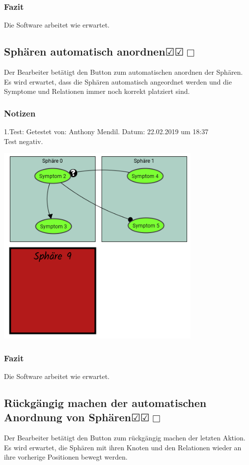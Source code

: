 \documentclass{scrartcl}
\newcommand{\subsectiont}[2]{\subsection[#1]{#1{\normalsize\normalfont #2}}}
\newcommand{\leer}{$\Box$}
\newcommand{\ok}{$\CheckedBox$}
\begin{document}
\subsubsection{Fazit}
Die Software arbeitet wie erwartet.

\subsectiont{Sphären automatisch anordnen}{\dotfill\ok\ok\leer}
Der Bearbeiter betätigt den Button zum automatischen anordnen der Sphären. Es wird erwartet, dass die Sphären automatisch angeordnet werden und die Symptome und Relationen immer noch korrekt platziert sind.
\subsubsection{Notizen}
1.Test: Getestet von: Anthony Mendil. Datum: 22.02.2019 um 18:37 \\
Test negativ.
\begin{center}
\includegraphics[height=10cm]{2_17.PNG}
\end{center}
\subsubsection{Fazit}
Die Software arbeitet wie erwartet.

\subsectiont{Rückgängig machen der automatischen Anordnung von Sphären}{\dotfill\ok\ok\leer}
Der Bearbeiter betätigt den Button zum rückgängig machen der letzten Aktion. Es wird erwartet, die Sphären mit ihren Knoten und den Relationen wieder an ihre vorherige Positionen bewegt werden.
\end{document}
